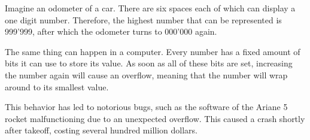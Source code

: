 
Imagine an odometer of a car. There are six spaces each of which can display a one digit number. Therefore, the highest number that can be represented is 999'999, after which the odometer turns to 000'000 again.

The same thing can happen in a computer. Every number has a fixed amount of bits it can use to store its value. As soon as all of these bits are set, increasing the number again will cause an overflow, meaning that the number will wrap around to its smallest value.

This behavior has led to notorious bugs, such as the software of the Ariane 5 rocket malfunctioning due to an unexpected overflow. This caused a crash shortly after takeoff, costing several hundred million dollars.

